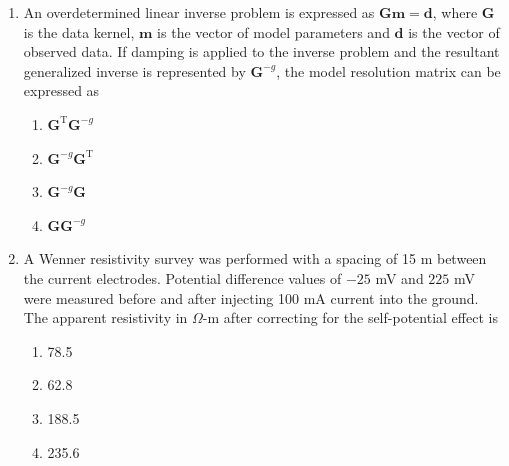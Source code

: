 \documentclass[journal,12pt,onecolumn]{IEEEtran}
\begin{document}
\begin{enumerate}
\hfill{}

\begin{multicols}{4}
\begin{enumerate}
\item 2.0
\item $\sqrt{2}$
\item 1.0
\item 0.0
\end{enumerate}
\end{multicols}

\item An overdetermined linear inverse problem is expressed as $\mathbf{G}\mathbf{m}=\mathbf{d}$, where $\mathbf{G}$ is the data kernel, $\mathbf{m}$ is the vector of model parameters and $\mathbf{d}$ is the vector of observed data. If damping is applied to the inverse problem and the resultant generalized inverse is represented by $\mathbf{G}^{-g}$, the model resolution matrix can be expressed as  

\hfill{}

\begin{multicols}{2}
\begin{enumerate}
\item $\mathbf{G}^\mathrm{T}\mathbf{G}^{-g}$
\item $\mathbf{G}^{-g}\mathbf{G}^\mathrm{T}$
\item $\mathbf{G}^{-g}\mathbf{G}$
\item $\mathbf{G}\mathbf{G}^{-g}$
\end{enumerate}
\end{multicols}

\item A Wenner resistivity survey was performed with a spacing of 15 m between the current electrodes. Potential difference values of $-25$ mV and $225$ mV were measured before and after injecting 100 mA current into the ground. The apparent resistivity in $\Omega$-m after correcting for the self-potential effect is  

\hfill{}

\begin{multicols}{4}
\begin{enumerate}
\item 78.5
\item 62.8
\item 188.5
\item 235.6
\end{enumerate}
\end{multicols}


\end{enumerate}
\end{document}
